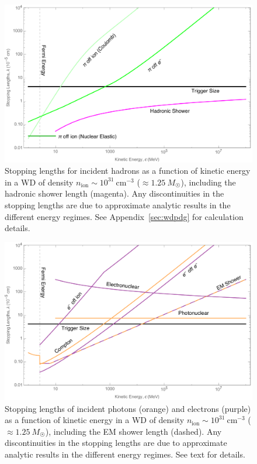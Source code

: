 \begin{figure}
\includegraphics[scale=.3]{SPhighHad.pdf}
\caption{Stopping lengths for incident hadrons as a function of kinetic energy in a WD of density $n_\text{ion} \sim 10^{31}~\text{cm}^{-3}$ ($\approx 1.25 ~M_{\astrosun}$), including the hadronic shower length (magenta).
Any discontinuities in the stopping lengths are due to approximate analytic results in the different energy regimes.
See Appendix~\ref{sec:wdpdg} for calculation details.
}
\label{fig:SPhighHad}
\end{figure}

\begin{figure}
\includegraphics[scale=.3]{SPhighEM.pdf}
\caption{Stopping lengths of incident photons (orange) and electrons (purple) as a function of kinetic energy in a WD of density $n_\text{ion} \sim 10^{31}~\text{cm}^{-3}$ ($\approx 1.25 ~M_{\astrosun}$), including the EM shower length (dashed).
Any discontinuities in the stopping lengths are due to approximate analytic results in the different energy regimes.
See text for details.
}
\label{fig:SPhighEM}
\end{figure}


